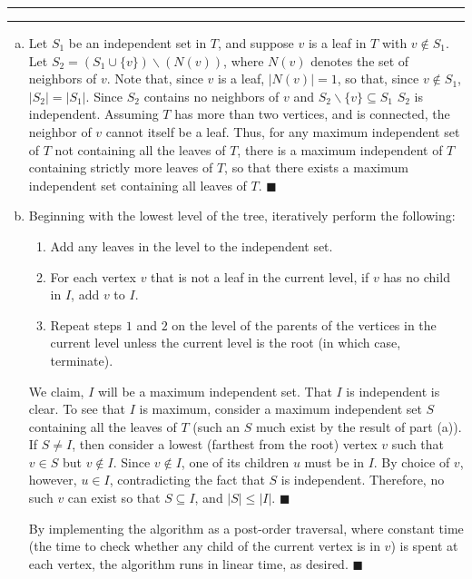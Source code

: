\documentclass[11pt]{article}
\newcounter{questionCounter}
\newcounter{partCounter}[questionCounter]
\newenvironment{question}[2][\arabic{questionCounter}]{%
    \setcounter{partCounter}{0}%
    \vspace{.25in} \hrule \vspace{0.5em}%
        \noindent{\bf #2}%
    \vspace{0.8em} \hrule \vspace{.10in}%
    \addtocounter{questionCounter}{1}%
}{}
\renewcommand{\qed}{\quad $\blacksquare$}
\begin{document}
\newpage
\begin{question}{Maximum Independent Set in a Tree}
\begin{enumerate}[(a)]
\item Let $S_1$ be an independent set in $T$, and suppose $v$ is a leaf in $T$
with $v \not \in S_1$. Let $S_2 = (S_1 \cup \{v\})\backslash(N(v))$, where
$N(v)$ denotes the set of neighbors of $v$. Note that, since $v$ is a leaf,
$|N(v)| = 1$, so that, since $v \not \in S_1$, $|S_2| = |S_1|$. Since $S_2$
contains no neighbors of $v$ and $S_2\backslash\{v\} \subseteq S_1$
$S_2$ is independent. Assuming $T$ has more than two vertices, and is
connected, the neighbor of $v$ cannot itself be a leaf. Thus, for any maximum
independent set of $T$ not containing all the leaves of $T$, there is a
maximum independent of $T$ containing strictly more leaves of $T$, so that
there exists a maximum independent set containing all leaves of $T$. \qed

\item Beginning with the lowest level of the tree, iteratively perform the
following:
\begin{enumerate}
\item Add any leaves in the level to the independent set.

\item For each vertex $v$ that is not a leaf in the current level, if $v$ has
no child in $I$, add $v$ to $I$.

\item Repeat steps $1$ and $2$ on the level of the parents of the vertices in
the current level unless the current level is the root (in which case,
terminate).
\end{enumerate}
We claim, $I$ will be a maximum independent set. That $I$ is independent is
clear. To see that $I$ is maximum, consider a maximum independent set $S$
containing all the leaves of $T$ (such an $S$ much exist by the result of part
(a)). If $S \neq I$, then consider a lowest (farthest from the root) vertex
$v$ such that $v \in S$ but $v \not \in I$. Since $v \not \in I$, one of its
children $u$ must be in $I$. By choice of $v$, however, $u \in I$,
contradicting the fact that $S$ is independent. Therefore, no such $v$ can
exist so that $S \subseteq I$, and $|S| \leq |I|$. \qed

By implementing the algorithm as a post-order traversal, where constant time
(the time to check whether any child of the current vertex is in $v$) is spent
at each vertex, the algorithm runs in linear time, as desired. \qed


\end{enumerate}
\end{question}
\end{document}
